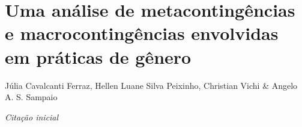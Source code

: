 \chapter{Uma análise de metacontingências e macrocontingências envolvidas em práticas de gênero}
\begin{flushright}
\begin{scriptsize}
    Júlia Cavalcanti Ferraz, Hellen Luane Silva Peixinho, Christian Vichi \& Angelo A. S. Sampaio    
\end{scriptsize}
\vspace{1cm}

\emph{Citação inicial}
\end{flushright}